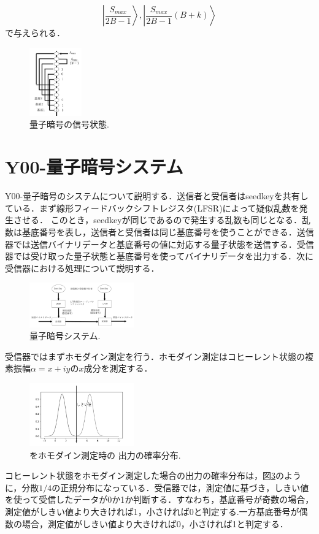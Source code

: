 \documentclass[a4j,twocolumn]{jarticle}
\begin{document}
$$
\left |\frac{S_{max}}{2B-1}\right\rangle,\left |\frac{S_{max}}{2B-1}(B+k)\right\rangle
$$
で与えられる．
\begin{figure}[htbp]
        \centering   
        \includegraphics[width=0.2\textwidth]{img/zemi30.png}
        \caption[sample image (png)]{量子暗号の信号状態.}
        \label{Fig:3_2}
    \end{figure}
    
\section{Y00-量子暗号システム}
Y00-量子暗号のシステムについて説明する．送信者と受信者はseedkeyを共有している．まず線形フィードバックシフトレジスタ(LFSR)によって疑似乱数を発生させる．
このとき，seedkeyが同じであるので発生する乱数も同じとなる．乱数は基底番号を表し，送信者と受信者は同じ基底番号を使うことができる．送信器では送信バイナリデータと基底番号の値に対応する量子状態を送信する．受信器では受け取った量子状態と基底番号を使ってバイナリデータを出力する．次に受信器における処理について説明する．

\begin{figure}[htbp]
        \centering   
        \includegraphics[width=0.4\textwidth]{img/zemi1-1-2.png}
        \caption[sample image (png)]{量子暗号システム.}
        \label{fig:4_1}
    \end{figure}



受信器ではまずホモダイン測定を行う．ホモダイン測定はコヒーレント状態の複素振幅$\alpha=x+iy$の$x$成分を測定する．
\begin{figure}[htbp]
        \centering   
        \includegraphics[width=0.4\textwidth]{img/zemi31.png}
        \caption[sample image (png)]{をホモダイン測定時の
出力の確率分布.}
        \label{fig:4_2}
    \end{figure}
コヒーレント状態をホモダイン測定した場合の出力の確率分布は，図\ref{fig:4_2}のように，分散$1/4$の正規分布になっている．受信器では，測定値に基づき，しきい値を使って受信したデータが0か1か判断する．すなわち，基底番号が奇数の場合，測定値がしきい値より大きければ1，小さければ0と判定する.一方基底番号が偶数の場合，測定値がしきい値より大きければ0，小さければ1と判定する．
\end{document}
